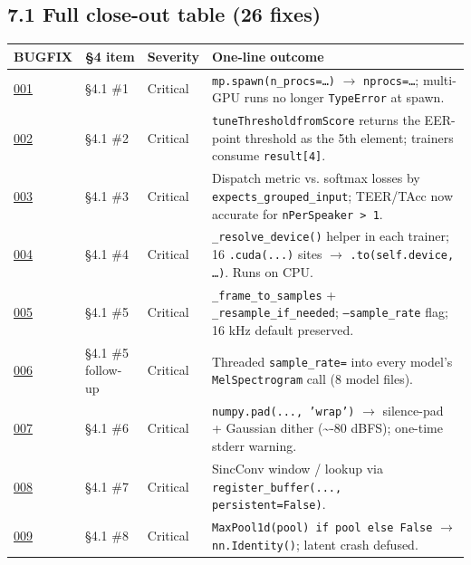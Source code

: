 \documentclass[10pt,a4paper]{article}
\renewcommand{\arraystretch}{1.15}
\begin{document}
\subsection*{7.1 Full close-out table (26 fixes)}

\begin{center}
\small
\renewcommand{\arraystretch}{1.25}
\begin{tabularx}{\textwidth}{|Y|Y|Y|Y|}
\hline
BUGFIX & §4 item & Severity & One-line outcome \\
\hline
\href{docs/bugfixes/BUGFIX-001-mp-spawn-kwarg.md}{001} & §4.1 \#1 & Critical & \texttt{mp.spawn(n\_procs=…)} $\rightarrow$ \texttt{nprocs=…}; multi-GPU runs no longer \texttt{TypeError} at spawn. \\
\hline
\href{docs/bugfixes/BUGFIX-002-eer-threshold-not-returned.md}{002} & §4.1 \#2 & Critical & \texttt{tuneThresholdfromScore} returns the EER-point threshold as the 5th element; trainers consume \texttt{result[4]}. \\
\hline
\href{docs/bugfixes/BUGFIX-003-nperspeaker-accuracy.md}{003} & §4.1 \#3 & Critical & Dispatch metric vs. softmax losses by \texttt{expects\_grouped\_input}; TEER/TAcc now accurate for \texttt{nPerSpeaker > 1}. \\
\hline
\href{docs/bugfixes/BUGFIX-004-hard-cuda-call.md}{004} & §4.1 \#4 & Critical & \texttt{\_resolve\_device()} helper in each trainer; 16 \texttt{.cuda(...)} sites $\rightarrow$ \texttt{.to(self.device, …)}. Runs on CPU. \\
\hline
\href{docs/bugfixes/BUGFIX-005-sample-rate-hardcoded.md}{005} & §4.1 \#5 & Critical & \texttt{\_frame\_to\_samples} + \texttt{\_resample\_if\_needed}; \texttt{--sample\_rate} flag; 16 kHz default preserved. \\
\hline
\href{docs/bugfixes/BUGFIX-006-model-side-sample-rate-threading.md}{006} & §4.1 \#5 follow-up & Critical & Threaded \texttt{sample\_rate=} into every model's \texttt{MelSpectrogram} call (8 model files). \\
\hline
\href{docs/bugfixes/BUGFIX-007-wrap-padding-fabricates-periodicity.md}{007} & §4.1 \#6 & Critical & \texttt{numpy.pad(..., 'wrap')} $\rightarrow$ silence-pad + Gaussian dither (\textasciitilde{}-80 dBFS); one-time stderr warning. \\
\hline
\href{docs/bugfixes/BUGFIX-008-sincconv-buffer-placement.md}{008} & §4.1 \#7 & Critical & SincConv window / lookup via \texttt{register\_buffer(..., persistent=False)}. \\
\hline
\href{docs/bugfixes/BUGFIX-009-rawnet-pool-placeholder.md}{009} & §4.1 \#8 & Critical & \texttt{MaxPool1d(pool) if pool else False} $\rightarrow$ \texttt{nn.Identity()}; latent crash defused. \\

\end{tabularx}
\end{center}
\end{document}
